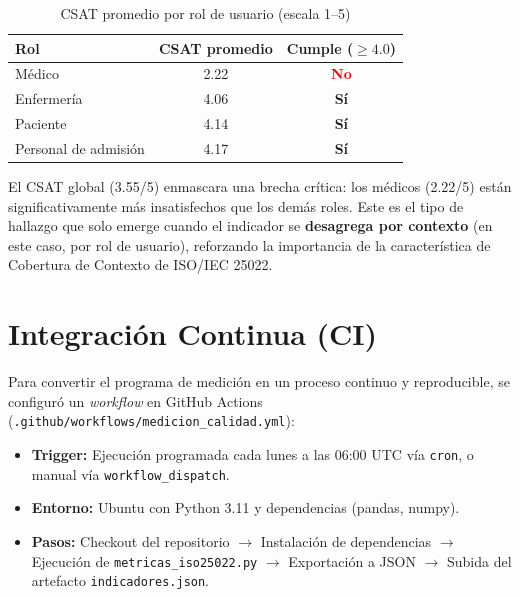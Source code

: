 \documentclass[12pt,a4paper]{article}
\begin{document}
\begin{table}[H]
\centering
\caption{CSAT promedio por rol de usuario (escala 1--5)}
\begin{tabular}{l c c}
\toprule
\textbf{Rol} & \textbf{CSAT promedio} & \textbf{Cumple ($\ge 4.0$)} \\
\midrule
M\'edico & 2.22 & \textcolor{red}{\textbf{No}} \\
Enfermer\'ia & 4.06 & \textcolor{green!60!black}{\textbf{S\'i}} \\
Paciente & 4.14 & \textcolor{green!60!black}{\textbf{S\'i}} \\
Personal de admisi\'on & 4.17 & \textcolor{green!60!black}{\textbf{S\'i}} \\
\bottomrule
\end{tabular}
\end{table}

\begin{tcolorbox}[colback=blue!5, colframe=blue!50!black, title=Lectura para la gerencia]
El CSAT global (3.55/5) enmascara una brecha cr\'itica: los m\'edicos (2.22/5) est\'an significativamente m\'as insatisfechos que los dem\'as roles. Este es el tipo de hallazgo que solo emerge cuando el indicador se \textbf{desagrega por contexto} (en este caso, por rol de usuario), reforzando la importancia de la caracter\'istica de Cobertura de Contexto de ISO/IEC 25022.
\end{tcolorbox}

\section{Integraci\'on Continua (CI)}

Para convertir el programa de medici\'on en un proceso continuo y reproducible, se configur\'o un \textit{workflow} en GitHub Actions (\texttt{.github/workflows/medicion\_calidad.yml}):

\begin{itemize}
    \item \textbf{Trigger:} Ejecuci\'on programada cada lunes a las 06:00 UTC v\'ia \texttt{cron}, o manual v\'ia \texttt{workflow\_dispatch}.
    \item \textbf{Entorno:} Ubuntu con Python 3.11 y dependencias (pandas, numpy).
    \item \textbf{Pasos:} Checkout del repositorio $\rightarrow$ Instalaci\'on de dependencias $\rightarrow$ Ejecuci\'on de \texttt{metricas\_iso25022.py} $\rightarrow$ Exportaci\'on a JSON $\rightarrow$ Subida del artefacto \texttt{indicadores.json}.
\end{itemize}
\end{document}
